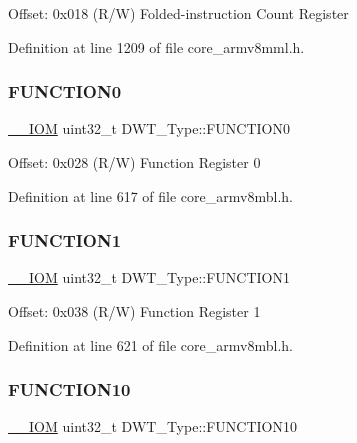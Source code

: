 Offset\+: 0x018 (R/W) Folded-\/instruction Count Register 

Definition at line 1209 of file core\+\_\+armv8mml.\+h.

\mbox{\label{struct_d_w_t___type_a579ae082f58a0317b7ef029b20f52889}} 
\subsubsection{\texorpdfstring{F\+U\+N\+C\+T\+I\+O\+N0}{FUNCTION0}}
{\footnotesize\ttfamily \hyperlink{core__sc300_8h_ab6caba5853a60a17e8e04499b52bf691}{\+\_\+\+\_\+\+I\+OM} uint32\+\_\+t D\+W\+T\+\_\+\+Type\+::\+F\+U\+N\+C\+T\+I\+O\+N0}

Offset\+: 0x028 (R/W) Function Register 0 

Definition at line 617 of file core\+\_\+armv8mbl.\+h.

\mbox{\label{struct_d_w_t___type_a8dfcf25675f9606aa305c46e85182e4e}} 
\subsubsection{\texorpdfstring{F\+U\+N\+C\+T\+I\+O\+N1}{FUNCTION1}}
{\footnotesize\ttfamily \hyperlink{core__sc300_8h_ab6caba5853a60a17e8e04499b52bf691}{\+\_\+\+\_\+\+I\+OM} uint32\+\_\+t D\+W\+T\+\_\+\+Type\+::\+F\+U\+N\+C\+T\+I\+O\+N1}

Offset\+: 0x038 (R/W) Function Register 1 

Definition at line 621 of file core\+\_\+armv8mbl.\+h.

\mbox{\label{struct_d_w_t___type_a63c72c28fd46b22230894366a8d9cdda}} 
\subsubsection{\texorpdfstring{F\+U\+N\+C\+T\+I\+O\+N10}{FUNCTION10}}
{\footnotesize\ttfamily \hyperlink{core__sc300_8h_ab6caba5853a60a17e8e04499b52bf691}{\+\_\+\+\_\+\+I\+OM} uint32\+\_\+t D\+W\+T\+\_\+\+Type\+::\+F\+U\+N\+C\+T\+I\+O\+N10}

